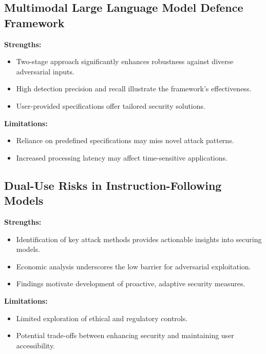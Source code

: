 \documentclass[journal]{IEEEtran}  %
\begin{document}
\subsection{Multimodal Large Language Model Defence Framework}
\textbf{Strengths:}
\begin{itemize}
    \item Two-stage approach significantly enhances robustness against diverse adversarial inputs.
    \item High detection precision and recall illustrate the framework’s effectiveness.
    \item User-provided specifications offer tailored security solutions.
\end{itemize}
\textbf{Limitations:}
\begin{itemize}
    \item Reliance on predefined specifications may miss novel attack patterns.
    \item Increased processing latency may affect time-sensitive applications.
\end{itemize}

\subsection{Dual-Use Risks in Instruction-Following Models}
\textbf{Strengths:}
\begin{itemize}
    \item Identification of key attack methods provides actionable insights into securing models.
    \item Economic analysis underscores the low barrier for adversarial exploitation.
    \item Findings motivate development of proactive, adaptive security measures.
\end{itemize}
\textbf{Limitations:}
\begin{itemize}
    \item Limited exploration of ethical and regulatory controls.
    \item Potential trade-offs between enhancing security and maintaining user accessibility.
\end{itemize}
\end{document}
